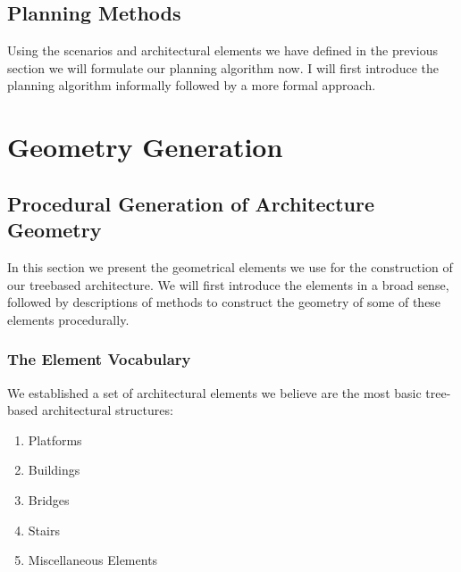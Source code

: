\section{Planning Methods}

%
%
%
%
\label{sec:PlanningAlgorithm} 
  
 Using the scenarios and architectural elements we have defined in the previous section we will formulate our planning algorithm now.
 I will first introduce the planning algorithm informally followed by a more formal approach.
      
  


\chapter{Geometry Generation}

\section{Procedural Generation of Architecture Geometry} 
\label{sec:archelements}
 
In this section we present the geometrical elements we use for the construction of our treebased architecture. We will first introduce the elements in a broad sense, followed by descriptions of methods to construct the geometry of some of these elements procedurally. 
 
\subsection{The Element Vocabulary}
We established a set of architectural elements we believe are the most basic tree-based architectural structures: 

\begin{enumerate}
\item Platforms
\item Buildings
\item Bridges 
\item Stairs
\item Miscellaneous Elements 
\end{enumerate} 

